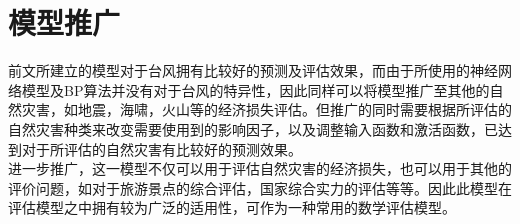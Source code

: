 \documentclass[12pt]{article}
\begin{document}
\vspace{20pt}

\section{模型推广}

前文所建立的模型对于台风拥有比较好的预测及评估效果，而由于所使用的神经网络模型及BP算法并没有对于台风的特异性，因此同样可以将模型推广至其他的自然灾害，如地震，海啸，火山等的经济损失评估。但推广的同时需要根据所评估的自然灾害种类来改变需要使用到的影响因子，以及调整输入函数和激活函数，已达到对于所评估的自然灾害有比较好的预测效果。\\
\indent 进一步推广，这一模型不仅可以用于评估自然灾害的经济损失，也可以用于其他的评价问题，如对于旅游景点的综合评估，国家综合实力的评估等等。因此此模型在评估模型之中拥有较为广泛的适用性，可作为一种常用的数学评估模型。
\end{document}
